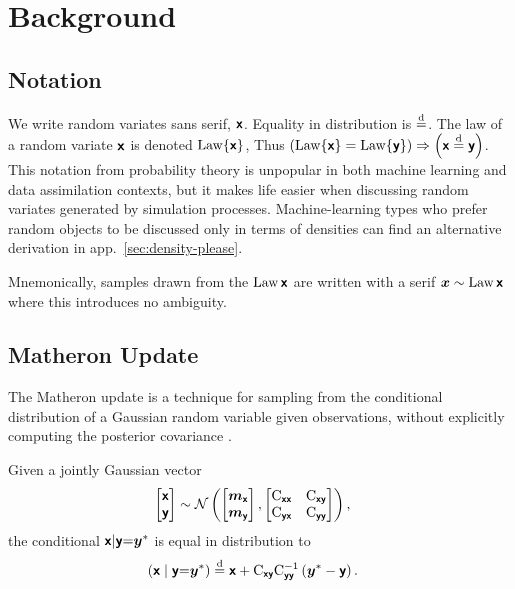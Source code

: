 \documentclass{article}
\begin{document}
\section{Background}

\subsection{Notation}

We write random variates sans serif, $\boldsymbol{\mathsf{x}}$.
Equality in distribution is $\stackrel{\mathrm{d}}{=}$.
The law of a random variate $\boldsymbol{\mathsf{x}}$ is denoted $\operatorname{Law}\{\boldsymbol{\mathsf{x}}\}$,
Thus $\left(\operatorname{Law}\{\boldsymbol{\mathsf{x}}\}=\operatorname{Law}\{\boldsymbol{\mathsf{y}}\}\right) \Rightarrow \left(\boldsymbol{\mathsf{x}}\stackrel{\mathrm{d}}{=}\boldsymbol{\mathsf{y}}\right)$.
This notation from probability theory is unpopular in both machine learning and data assimilation contexts, but it makes life easier when discussing random variates generated by simulation processes.
Machine-learning types who prefer  random objects to be discussed only in terms of densities can find an alternative derivation in app.~\ref{sec:density-please}.

Mnemonically, samples drawn from the $\operatorname{Law}{\boldsymbol{\mathsf{x}}}$ are written with a serif $\boldsymbol{x}\sim\operatorname{Law}{\boldsymbol{\mathsf{x}}}$ where this introduces no ambiguity.

\subsection{Matheron Update}

The Matheron update is a technique for sampling from the conditional distribution of a Gaussian random variable given observations, without explicitly computing the posterior covariance \citep{Doucet2010Note,Wilson2020Efficiently,Wilson2021Pathwise}.

\begin{lemma}
Given a jointly Gaussian vector
\begin{align}
    \begin{bmatrix} \boldsymbol{\mathsf{x}} \\ \boldsymbol{\mathsf{y}} \end{bmatrix}
    &\sim \mathcal{N}\left(\begin{bmatrix} \boldsymbol{m}_{\boldsymbol{\mathsf{x}}} \\ \boldsymbol{m}_{\boldsymbol{\mathsf{y}}} \end{bmatrix}, \begin{bmatrix} \mathrm{C}_{\boldsymbol{\mathsf{xx}}} & \mathrm{C}_{\boldsymbol{\mathsf{xy}}} \\ \mathrm{C}_{\boldsymbol{\mathsf{yx}}} & \mathrm{C}_{\boldsymbol{\mathsf{yy}}} \end{bmatrix}\right), \label{eq:joint-gaussian}
\end{align}
the conditional $\boldsymbol{\mathsf{x}} | \boldsymbol{\mathsf{y}} {=} \boldsymbol{y}^*$ is equal in distribution to
\begin{align}
    \left(\boldsymbol{\mathsf{x}} \mid \boldsymbol{\mathsf{y}} {=} \boldsymbol{y}^*\right)
    &\stackrel{\mathrm{d}}{=} \boldsymbol{\mathsf{x}} + \mathrm{C}_{\boldsymbol{\mathsf{xy}}} \mathrm{C}_{\boldsymbol{\mathsf{yy}}}^{-1} \left( \boldsymbol{y}^* - \boldsymbol{\mathsf{y}} \right).
    \label{eq:matheron-update}
\end{align}
\end{lemma}
\end{document}
